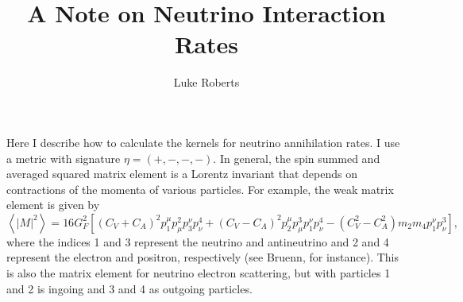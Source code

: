 \documentclass[12pt,letter]{article}
\title{A Note on Neutrino Interaction Rates}
\author{Luke Roberts}
\date{} %
\begin{document}
\maketitle

Here I describe how to calculate the kernels for neutrino annihilation rates.  I use a metric with signature $\eta = (+,-,-,-)$.  In general, the spin summed and averaged squared matrix element is a Lorentz invariant that depends on contractions of the momenta of various particles.  For example, the weak matrix element is given by  
\begin{equation*}
\left\langle \left| M \right|^2 \right \rangle = 16 G_F^2 \left [ 
(C_V + C_A)^2 p^\mu_1 p_\mu^2 p^\nu_3 p_\nu^4
+(C_V - C_A)^2 p^\mu_2 p_\mu^3 p^\nu_1 p_\nu^4
-(C_V^2 - C_A^2) m_2 m_4 p^\nu_1 p_\nu^3
\right],
\end{equation*}
where the indices 1 and 3 represent the neutrino and antineutrino and 2 and 4 represent the electron and positron, respectively (see Bruenn, for instance).  This is also the matrix element for neutrino electron scattering, but with particles 1 and 2 is ingoing and 3 and 4 as outgoing particles.
\end{document}
